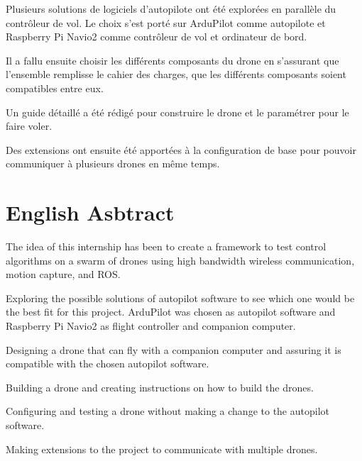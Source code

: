 Plusieurs solutions de logiciels d'autopilote ont été explorées en parallèle du contrôleur de vol. Le choix s'est porté sur ArduPilot comme autopilote et Raspberry Pi Navio2 comme contrôleur de vol et ordinateur de bord.

Il a fallu ensuite choisir les différents composants du drone en s'assurant que l'ensemble remplisse le cahier des charges, que les différents composants soient compatibles entre eux.

Un guide détaillé a été rédigé pour construire le drone et le paramétrer pour le faire voler.

Des extensions ont ensuite été apportées à la configuration de base pour pouvoir communiquer à plusieurs drones en même temps.


\section*{English Asbtract}
The idea of this internship has been to create a framework to test control algorithms on a swarm of drones using high bandwidth wireless communication, motion capture, and ROS.

Exploring the possible solutions of autopilot software to see which one would be the best fit for this project. ArduPilot was chosen as autopilot software and Raspberry Pi Navio2 as flight controller and companion computer.

Designing a drone that can fly with a companion computer and assuring it is compatible with the chosen autopilot software.

Building a drone and creating instructions on how to build the drones.

Configuring and testing a drone without making a change to the autopilot software.

Making extensions to the project to communicate with multiple drones.
